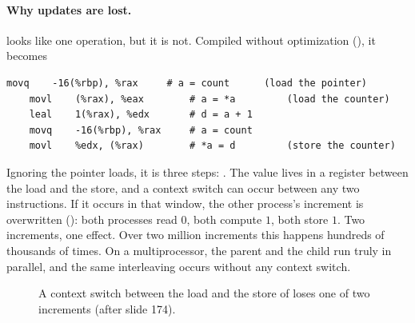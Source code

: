 \paragraph{Why updates are lost.}  looks like one operation, but it is not. Compiled without optimization (), it becomes
\begin{lstlisting}[style=sh]
    movq    -16(%rbp), %rax     # a = count      (load the pointer)
    movl    (%rax), %eax        # a = *a         (load the counter)
    leal    1(%rax), %edx       # d = a + 1
    movq    -16(%rbp), %rax     # a = count
    movl    %edx, (%rax)        # *a = d         (store the counter)
\end{lstlisting}
Ignoring the pointer loads, it is three steps: . The value lives in a register between the load and the store, and a context switch can occur between any two instructions. If it occurs in that window, the other process's increment is overwritten (): both processes read $0$, both compute $1$, both store $1$. Two increments, one effect. Over two million increments this happens hundreds of thousands of times. On a multiprocessor, the parent and the child run truly in parallel, and the same interleaving occurs without any context switch.

\begin{figure}[htbp]
\centering
{}
\caption{A context switch between the load and the store of  loses one of two increments (after slide 174).}
\label{fig:race}
\end{figure}

